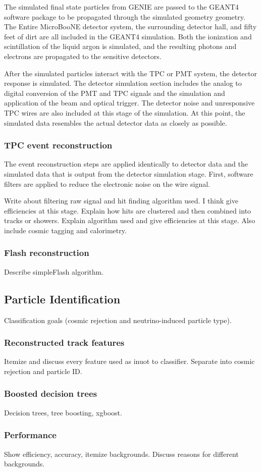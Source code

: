     The simulated final state particles from GENIE are passed to the
    GEANT4~\cite{geant4} software package to be propagated through the
    simulated geometry geometry. The Entire MicroBooNE detector system, the
    surrounding detector hall, and fifty feet of dirt are all included in the
    GEANT4 simulation. Both the ionization and scintillation of the liquid
    argon is simulated, and the resulting photons and electrons are propagated
    to the sensitive detectors.

    After the simulated particles interact with the TPC or PMT system, the
    detector response is simulated. The detector simulation section includes
    the analog to digital conversion of the PMT and TPC signals and the
    simulation and application of the beam and optical trigger. The detector
    noise and unresponsive TPC wires are also included at this stage of the
    simulation. At this point, the simulated data resembles the actual detector
    data as closely as possible.

  \subsubsection{TPC event reconstruction}
    The event reconstruction steps are applied identically to detector data and
    the simulated data that is output from the detector simulation stage.
    First, software filters are applied to reduce the electronic noise on the
    wire signal. 

    Write about filtering raw signal and hit finding algorithm used.
    I think give efficiencies at this stage.
    Explain how hits are clustered and then combined into tracks or showers.
    Explain algorithm used and give efficiencies at this stage. Also include
    cosmic tagging and calorimetry.
  \subsubsection{Flash reconstruction}
    Describe simpleFlash algorithm.


\subsection{Particle Identification}
  Classification goals (cosmic rejection and neutrino-induced particle type).
  \subsubsection{Reconstructed track features}
    Itemize and discuss every feature used as inuot to classifier.
    Separate into cosmic rejection and particle ID.
  \subsubsection{Boosted decision trees}
    Decision trees, tree boosting, xgboost.
  \subsubsection{Performance}
    Show efficiency, accuracy, itemize backgrounds.
    Discuss reasons for different backgrounds.


